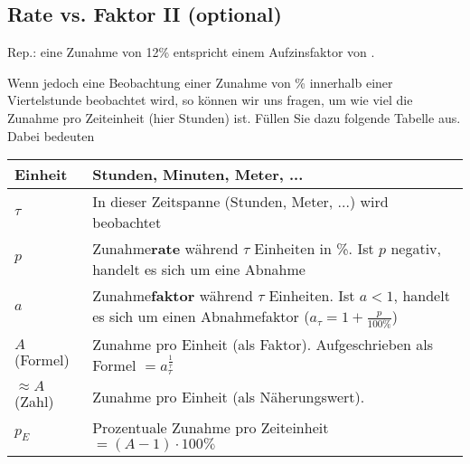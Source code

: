 \subsection{Rate vs. Faktor II (optional)}

Rep.: eine Zunahme von 12\% entspricht einem Aufzinsfaktor von .

Wenn jedoch eine Beobachtung einer Zunahme von \% innerhalb einer Viertelstunde beobachtet wird, so können wir uns fragen, um wie viel die Zunahme pro Zeiteinheit (hier Stunden) ist.
\newpage
Füllen Sie dazu folgende Tabelle aus. Dabei bedeuten

\begin{tabular}{lp{14cm}}\hline
  Einheit & Stunden, Minuten, Meter, ... \\\hline
  $\tau$  & In dieser Zeitspanne (Stunden, Meter, ...) wird beobachtet \\\hline
  $p$     & Zunahme\textbf{rate}\index{Zunahmerate}\index{Rate} während $\tau$ Einheiten in \%. Ist $p$ negativ, handelt es sich um eine Abnahme\\\hline
  $a$ & Zunahme\textbf{faktor}\index{Zunahmefaktor} während
  $\tau$ Einheiten. Ist $a<1$, handelt es sich um einen Abnahmefaktor
  ($a_{\tau} = 1+\frac{p}{100\%}$)\\\hline
  $A$ (Formel)   & Zunahme pro Einheit (als Faktor). Aufgeschrieben
  als Formel $=a_{\tau}^{\frac1{\tau}}$\\\hline
  $\approx A$ (Zahl)  & Zunahme pro Einheit (als Näherungswert).\\\hline
  $p_E$   & Prozentuale Zunahme pro Zeiteinheit $=(A-1)\cdot{}100\%$\\\hline
  \end{tabular} 

\leserluft{}
\leserluft{}
\newcommand{\ph}[1]{\noTRAINER{...........}\TRAINER{#1}}

